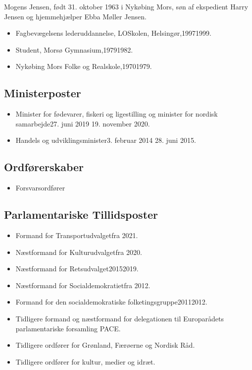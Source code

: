 \documentclass[11pt, a4paper]{awesome-cv}
\begin{document}
\makecvheader[R]
\makelettertitle
\begin{cvletter}
Mogens Jensen, født 31. oktober 1963 i Nykøbing Mors, søn af ekspedient Harry Jensen og hjemmehjælper Ebba Møller Jensen.

\begin{itemize}
\item Fagbevægelsens lederuddannelse, LOSkolen, Helsingør,19971999.
\item Student, Morsø Gymnasium,19791982.
\item Nykøbing Mors Folke og Realskole,19701979.
\end{itemize}
\subsection*{Ministerposter}
\begin{itemize}
\item Minister for fødevarer, fiskeri og ligestilling og minister for nordisk samarbejde27. juni 2019  19. november 2020.
\item Handels og udviklingsminister3. februar 2014  28. juni 2015.
\end{itemize}
\subsection*{Ordførerskaber}
\begin{itemize}
\item Forsvarsordfører
\end{itemize}
\subsection*{Parlamentariske Tillidsposter}
\begin{itemize}
\item Formand for Transportudvalgetfra 2021.
\item Næstformand for Kulturudvalgetfra 2020.
\item Næstformand for Retsudvalget20152019.
\item Næstformand for Socialdemokratietfra 2012.
\item Formand for den socialdemokratiske folketingsgruppe20112012.
\item Tidligere formand og næstformand for delegationen til Europarådets parlamentariske forsamling PACE.
\item Tidligere ordfører for Grønland, Færøerne og Nordisk Råd.
\item Tidligere ordfører for kultur, medier og idræt.
\end{itemize}

\end{cvletter}
\end{document}
